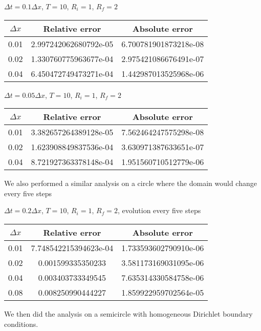 \documentclass[fleqn,12pt]{siamart1116}
\begin{document}
$\Delta t = 0.1 \Delta x$, $T = 10$, $R_i = 1$, $R_f = 2$
\begin{center}
\begin{tabular}{ |c||c|c| } 
 \hline
 $\Delta x$ & Relative error & Absolute error \\ 
 \hline
 \hline
 0.01 & 2.997242062680792e-05 & 6.700781901873218e-08 \\ 
 \hline 
 0.02 & 1.330760775963677e-04 & 2.975421086676491e-07 \\ 
 \hline
 0.04 & 6.450472749473271e-04 & 1.442987013525968e-06 \\ 
 \hline
\end{tabular}
\end{center}
\medskip

$\Delta t = 0.05 \Delta x$, $T = 10$, $R_i = 1$, $R_f = 2$
\begin{center}
\begin{tabular}{ |c||c|c| } 
 \hline
 $\Delta x$ & Relative error & Absolute error \\ 
 \hline
 \hline
 0.01 & 3.382657264389128e-05 & 7.562464247575298e-08 \\ 
 \hline 
 0.02 & 1.623908849837536e-04 & 3.630971387633651e-07 \\ 
 \hline
 0.04 & 8.721927363378148e-04 & 1.951560710512779e-06 \\ 
 \hline
\end{tabular}
\end{center}
\medskip

We also performed a similar analysis on a circle where the domain would change every five steps

$\Delta t = 0.2 \Delta x$, $T = 10$, $R_i = 1$, $R_f = 2$, evolution every five steps
\begin{center}
\begin{tabular}{ |c||c|c| } 
 \hline
 $\Delta x$ & Relative error & Absolute error \\ 
 \hline
 \hline
 0.01 & 7.748542215394623e-04 & 1.733593602790910e-06 \\ 
 \hline 
 0.02 & 0.001599335350233 & 3.581173169031095e-06 \\ 
 \hline
 0.04 & 0.003403733349545 & 7.635314330584758e-06 \\ 
 \hline
 0.08 & 0.008250990444227 & 1.859922959702564e-05 \\ 
 \hline
\end{tabular}
\end{center}
\medskip

We then did the analysis on a semicircle with homogeneous Dirichlet boundary conditions.
\end{document}
